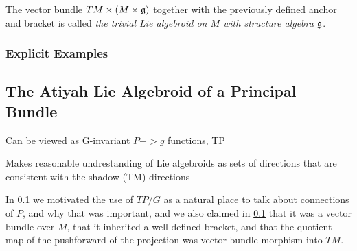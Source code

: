 The vector bundle $TM \times (M \times \mathfrak{g})$ together with the previously defined anchor and bracket is called \emph{the trivial Lie algebroid on $M$ with structure algebra $\mathfrak{g}$}.

\subsubsection{Explicit Examples}



\subsection{The Atiyah Lie Algebroid of a Principal Bundle}

Can be viewed as G-invariant $P-> g$ functions, TP 

Makes reasonable undrestanding of Lie algebroids as sets of directions that are consistent with the shadow (TM) directions

In \ref{} we motivated the use of $TP/G$ as a natural place to talk about connections of $P$, and why that was important, and we also claimed in \ref{} that it was a vector bundle over $M$, that it inherited a well defined bracket, and that the quotient map of the pushforward of the projection was vector bundle morphism into $TM$.

